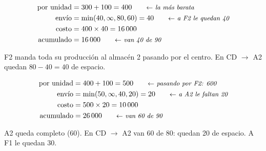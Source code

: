 \documentclass[11pt,a4paper]{article}
\newcommand{\ra}{\ensuremath{\to}}
\begin{document}
\noindent
\begin{minipage}[c]{0.32\textwidth}\centering
{}
\end{minipage}\hfill
\begin{minipage}[c]{0.66\textwidth}
\begin{align*}
\text{por unidad} &= 300 + 100 = 400 \nota{la más barata}\\
\text{envío} &= \min(40, \infty, 80, 60) = 40 \nota{a F2 le quedan 40}\\
\text{costo} &= 400 \times 40 = 16\,000\\
\text{acumulado} &= 16\,000 \nota{van 40 de 90}
\end{align*}
\end{minipage}

F2 manda toda su producción al almacén 2 pasando por el centro. En CD \ra{} A2 quedan $80 - 40 = 40$ de espacio.

\noindent
\begin{minipage}[c]{0.32\textwidth}\centering
{}
\end{minipage}\hfill
\begin{minipage}[c]{0.66\textwidth}
\begin{align*}
\text{por unidad} &= 400 + 100 = 500 \nota{pasando por F2: 600}\\
\text{envío} &= \min(50, \infty, 40, 20) = 20 \nota{a A2 le faltan 20}\\
\text{costo} &= 500 \times 20 = 10\,000\\
\text{acumulado} &= 26\,000 \nota{van 60 de 90}
\end{align*}
\end{minipage}

A2 queda completo (60). En CD \ra{} A2 van 60 de 80: quedan 20 de espacio. A F1 le quedan 30.
\end{document}
